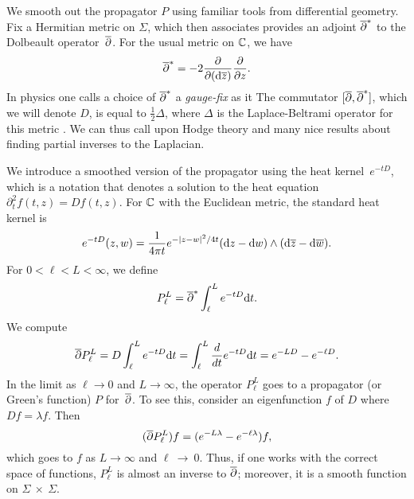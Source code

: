 \subsubsection{}

We smooth out the propagator $P$ using familiar tools from differential geometry.
Fix a Hermitian metric on $\Sigma$, 
which then associates provides an adjoint $\overline{\partial}^*$ to the Dolbeault operator~$\overline{\partial}$.
For the usual metric on $\mathbb C$, we have
\[
\overline{\partial}^* = -2 \frac{\partial}{\partial ({\rm d} \overline{z})} \frac{\partial}{\partial z}.
\]
In physics one calls a choice of $\overline{\partial}^*$ a {\em gauge-fix} as it 
The commutator $[\overline{\partial},\overline{\partial}^*]$, which we will denote $D$, 
is equal to $\tfrac{1}{2} \Delta$, where $\Delta$ is the Laplace-Beltrami operator for this metric .
We can thus call upon Hodge theory and many nice results about finding partial inverses to the Laplacian.


We introduce a smoothed version of the propagator using the heat kernel~$e^{-tD}$,
which is a notation that denotes a solution to the heat equation $\partial_t^2 f(t,z) = Df(t,z)$.
For $\mathbb C$ with the Euclidean metric, the standard heat kernel is
\[
e^{-tD}(z,w) =  \frac{1}{4\pi t} e^{-|z-w|^2/4t} ({\rm d} z - {\rm d} w) \wedge ({\rm d}\overline{z} - {\rm d}\overline{w}) . 
\]
For $0 < \ell < L < \infty$, we define
\[
P_\ell^L = \overline{\partial}^* \int_{\ell}^L e^{-tD}{\rm d} t.
\]
We compute
\[
\overline{\partial} P_\ell^L = D \int_{\ell}^L e^{-tD}{\rm d} t =  \int_{\ell}^L \frac{d}{dt} e^{-tD}{\rm d} t = e^{-LD} - e^{-\ell D}.
\]
In the limit as $\ell \to 0$ and $L \to \infty$, the operator $P_\ell^L$ goes to a propagator (or Green's function) $P$ for~$\overline{\partial}$.
To see this, consider an eigenfunction $f$ of $D$ where $Df=\lambda f$.
Then
\[
(\overline{\partial} P_\ell^L) f = (e^{-L\lambda} - e^{-\ell \lambda})f, 
\]
which goes to $f$ as $L \to \infty$ and $\ell~\to~0$.
Thus, if one works with the correct space of functions, 
$P_\ell^L$ is almost an inverse to $\overline{\partial}$;
moreover, it is a smooth function on $\Sigma~\times~\Sigma$.

\subsubsection{}

